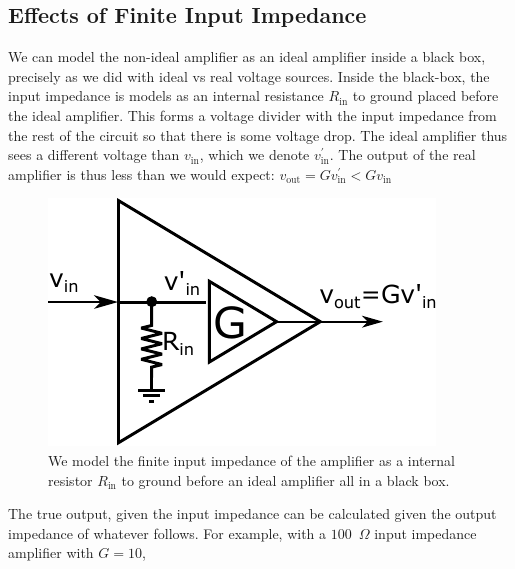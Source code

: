 \documentclass[]{article}
\begin{document}
\subsection{Effects of Finite Input Impedance}
\label{sec:AMP_effect_input}
We can model the non-ideal amplifier as an ideal amplifier inside a black box, precisely as we did with ideal vs real voltage sources. Inside the black-box, the input impedance is models as an internal resistance $R_\text{in}$ to ground placed before the ideal amplifier. This forms a voltage divider with the input impedance from the rest of the circuit so that there is some voltage drop. The ideal amplifier thus sees a different voltage than $v_\text{in}$, which we denote $v^\prime_\text{in}$. The output of the real amplifier is thus less than we would expect: $v_\text{out} = Gv^\prime_\text{in} < Gv_\text{in}$
\begin{figure}[h]
\caption{We model the finite input impedance of the amplifier as a internal resistor $R_\text{in}$ to ground before an ideal amplifier all in a black box.}
\label{fig:real_amp_int}
\begin{center}
\includegraphics{Images/RealAmplifier_int.pdf}
\end{center}
\end{figure}

The true output, given the input impedance can be calculated given the output impedance of whatever follows. For example, with a $100$~$\Omega$ input impedance amplifier with $G = 10$, 
\end{document}
